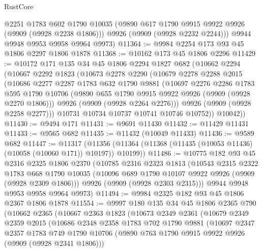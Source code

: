 \begin{lexlean}{RustCore}
\begin{coremodule}
        @2251
        @1783
        @602
        @1790
        @10035
        (@9890 @617 @1790 @9915 @9922 @9926 (@9909 (@9928 @2238 @1806)))
        @9926
        (@9909 (@9928 @2232 @2244)))
      @9944
      @9948
      @9953
      @9958
      @9964
      @9973)
@11364 := @9984 @2254 @173 @93 @45 @1806 @2297 @1806 @1878
@11368 := @10162 @173 @45 @1806 @2296
@11429 := @10172
    @171
    @135
    @34
    @45
    @1806
    @2294
    @1827
    @682
    (@10662
      @2294
      (@10667
        @2292
        @1823
        (@10673
          @2278
          @2290
          (@10679
            @2278
            @2288
            @2015
            (@10686
              @2277
              @2287
              @1783
              @632
              @1790
              @9881
              (@10697
                @2276
                @2286
                @1783
                @595
                @1790
                @10706
                (@9890 @655 @1790 @9915 @9922 @9926 (@9909 (@9928 @2270 @1806)))
                @9926
                (@9909 (@9928 @2264 @2276)))
              @9926
              (@9909 (@9928 @2258 @2277)))
            @10731
            @10734
            @10737
            @10741
            @10746
            @10752))
        @10042))
@11430 := @9494 @171
@11431 := @9691 @11430
@11432 := @11429 @11431
@11433 := @9565 @682
@11435 := @11432 (@10049 @11433)
@11436 := @9589 @682
@11447 := @11317
    (@11356 (@11364 (@11368 (@11435 (@10053 @11436) (@10058 (@10060 @171)) @10197)) @10199))
@11486 := @10775
    @182
    @93
    @45
    @2316
    @2325
    @1806
    @2370
    (@10785
      @2316
      @2323
      @1813
      (@10543
        @2315
        @2322
        @1783
        @668
        @1790
        @10035
        (@10096 @689 @1790 @10107 @9922 @9926 (@9909 (@9928 @2309 @1806)))
        @9926
        (@9909 (@9928 @2303 @2315)))
      @9944
      @9948
      @9953
      @9958
      @9964
      @9973)
@11494 := @9984 @2325 @182 @93 @45 @1806 @2367 @1806 @1878
@11554 := @9997
    @180
    @135
    @34
    @45
    @1806
    @2365
    @790
    (@10662
      @2365
      (@10667
        @2363
        @1823
        (@10673
          @2349
          @2361
          (@10679
            @2349
            @2359
            @2015
            (@10686
              @2348
              @2358
              @1783
              @702
              @1790
              @9881
              (@10697
                @2347
                @2357
                @1783
                @749
                @1790
                @10706
                (@9890 @763 @1790 @9915 @9922 @9926 (@9909 (@9928 @2341 @1806)))

\end{coremodule}
\end{lexlean}
